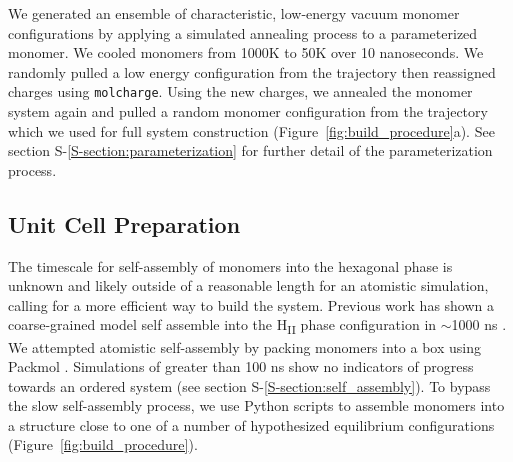\documentclass[journal=jpcbfk,manuscript=article]{achemso}
\begin{document}
  We generated an ensemble of characteristic, low-energy vacuum monomer
  configurations by applying a simulated annealing process to a
  parameterized monomer. We cooled monomers from 1000K to 50K over 10
  nanoseconds. We randomly pulled a low energy configuration from the
  trajectory then reassigned charges using \texttt{molcharge}. Using the new
  charges, we annealed the monomer system again and pulled a random monomer
  configuration from the trajectory which we used for full system
  construction (Figure~\ref{fig:build_procedure}a). See section S-\ref{S-section:parameterization} 
  for further detail of the parameterization process.

  \subsection{Unit Cell Preparation}

  The timescale for self-assembly of monomers into the hexagonal phase is
  unknown and likely outside of a reasonable length for an atomistic simulation,
  calling for a more efficient way to build the system. Previous work has shown
  a coarse-grained model self assemble into the H\textsubscript{II} phase
  configuration in $\sim$1000 ns \cite{mondal_self-assembly_2013}.  We
  attempted atomistic self-assembly by packing monomers into a box using Packmol
  \cite{martinez_packmol:_2009}. Simulations of greater than 100 ns show no
  indicators of progress towards an ordered system (see section S-\ref{S-section:self_assembly}). 
  To bypass the slow self-assembly process, we use Python scripts to assemble monomers
  into a structure close to one of a number of hypothesized equilibrium configurations
  (Figure~\ref{fig:build_procedure}).
  
\end{document}
